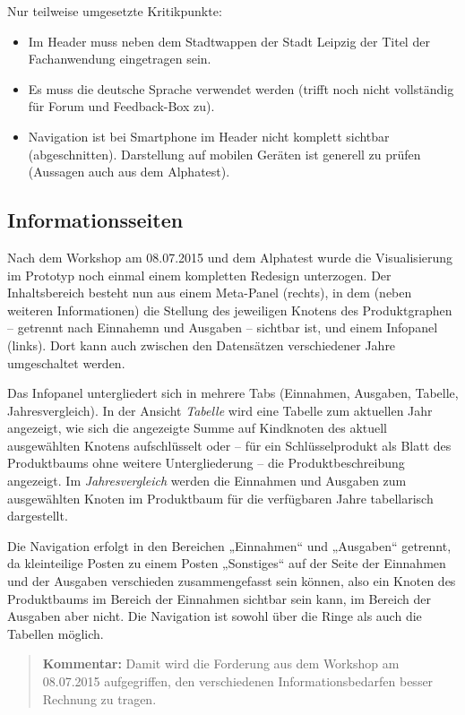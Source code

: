 \documentclass[11pt,a4paper,twoside]{article}
\newcommand{\kommentar}[1]{\begin{quote}\textbf{Kommentar:} #1 \end{quote}}
\begin{document}
Nur teilweise umgesetzte Kritikpunkte:
\begin{itemize}\itemsep0pt
\item Im Header muss neben dem Stadtwappen der Stadt Leipzig der Titel der
Fachanwendung eingetragen sein. 
\item Es muss die deutsche Sprache verwendet werden (trifft noch nicht
  vollständig für Forum und Feedback-Box zu).
\item Navigation ist bei Smartphone im Header nicht komplett sichtbar
  (abgeschnitten). Darstellung auf mobilen Geräten ist generell zu prüfen
  (Aussagen auch aus dem Alphatest). 
\end{itemize}

\subsection{Informationsseiten}

Nach dem Workshop am 08.07.2015 und dem Alphatest wurde die Visualisierung im
Prototyp noch einmal einem kompletten Redesign unterzogen. Der Inhaltsbereich
besteht nun aus einem Meta-Panel (rechts), in dem (neben weiteren
Informationen) die Stellung des jeweiligen Knotens des Produktgraphen --
getrennt nach Einnahemn und Ausgaben -- sichtbar ist, und einem Infopanel
(links).  Dort kann auch zwischen den Datensätzen verschiedener Jahre
umgeschaltet werden.

Das Infopanel untergliedert sich in mehrere Tabs (Einnahmen, Ausgaben, Tabelle,
Jahresvergleich). In der Ansicht \emph{Tabelle} wird eine Tabelle zum aktuellen
Jahr angezeigt, wie sich die angezeigte Summe auf Kindknoten des aktuell
ausgewählten Knotens aufschlüsselt oder -- für ein Schlüsselprodukt als Blatt
des Produktbaums ohne weitere Untergliederung -- die Produktbeschreibung
angezeigt. Im \emph{Jahresvergleich} werden die Einnahmen und Ausgaben zum
ausgewählten Knoten im Produktbaum für die verfügbaren Jahre tabellarisch
dargestellt.

Die Navigation erfolgt in den Bereichen „Einnahmen“ und „Ausgaben“ getrennt, da
kleinteilige Posten zu einem Posten „Sonstiges“ auf der Seite der Einnahmen und
der Ausgaben verschieden zusammengefasst sein können, also ein Knoten des
Produktbaums im Bereich der Einnahmen sichtbar sein kann, im Bereich der
Ausgaben aber nicht.  Die Navigation ist sowohl über die Ringe als auch die
Tabellen möglich.

\kommentar{Damit wird die Forderung aus dem Workshop am 08.07.2015
  aufgegriffen, den verschiedenen Informationsbedarfen besser Rechnung zu
  tragen.}
\end{document}
